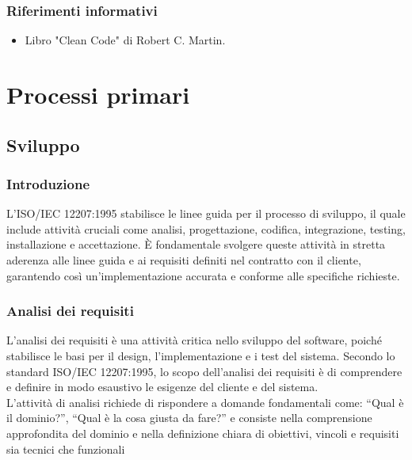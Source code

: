 \documentclass{article}
\begin{document}
\subsubsection{Riferimenti informativi}
\begin{itemize}
    \item  Libro "Clean Code" di Robert C. Martin.
\end{itemize}

\section{Processi primari}

\subsection{Sviluppo}

\subsubsection{Introduzione}
L'ISO/IEC 12207:1995 stabilisce le linee guida per il processo di sviluppo, il quale include attività cruciali come analisi, progettazione, codifica, integrazione, testing, installazione e accettazione. È fondamentale svolgere queste attività in stretta aderenza alle linee guida e ai requisiti definiti nel contratto con il cliente, garantendo così un'implementazione accurata e conforme alle specifiche richieste.

\subsubsection{Analisi dei requisiti}
L'analisi dei requisiti è una attività critica nello sviluppo del software, poiché stabilisce le basi per il design, l'implementazione e i test del sistema. Secondo lo standard ISO/IEC 12207:1995, lo scopo dell'analisi dei requisiti è di comprendere e definire in modo esaustivo le esigenze del cliente e del sistema. \\
L’attività di analisi richiede di rispondere a domande fondamentali come: “Qual è il dominio?”, “Qual è la cosa giusta da fare?” e consiste nella comprensione approfondita del dominio e nella definizione chiara di obiettivi, vincoli e requisiti sia tecnici che funzionali
\end{document}
